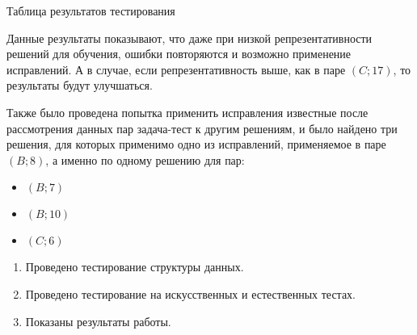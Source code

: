 \begin{table}[!h]
\caption{Таблица результатов тестирования}\label{tab1}
\centering
{}
\end{table}

Данные результаты показывают, что даже при низкой репрезентативности решений для обучения, ошибки повторяются и возможно применение
исправлений. А в случае, если репрезентативность выше, как в паре $(C;17)$, то результаты будут улучшаться.

Также было проведена попытка применить исправления известные после рассмотрения данных пар задача-тест к другим решениям, и было
найдено три решения, для которых применимо одно из исправлений, применяемое в паре $(B;8)$, а именно по одному решению для пар:
\begin{itemize}
\item $(B;7)$
\item $(B;10)$
\item $(C;6)$
\end{itemize}

\chapterconclusion

\begin{enumerate}
    \item Проведено тестирование структуры данных.
    \item Проведено тестирование на искусственных и естественных тестах.
    \item Показаны результаты работы.
\end{enumerate}
